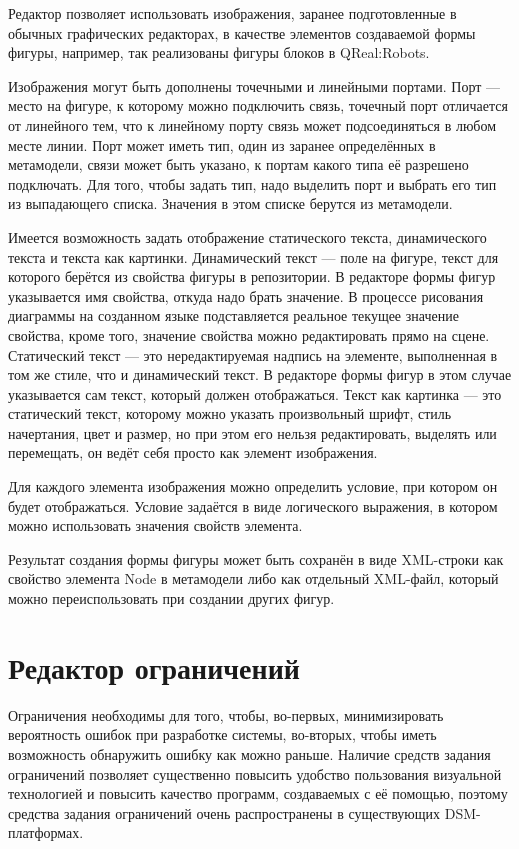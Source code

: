 Редактор позволяет использовать изображения, заранее подготовленные в обычных графических 
редакторах, в качестве элементов создаваемой формы фигуры, например, так реализованы 
фигуры блоков в QReal:Robots. 

Изображения могут быть дополнены точечными и линейными портами. Порт --- место на 
фигуре, к которому можно подключить связь, точечный порт отличается от линейного тем, 
что к линейному порту связь может подсоединяться в любом месте линии. Порт может иметь 
тип, один из заранее определённых в метамодели, связи может быть указано, к портам 
какого типа её разрешено подключать. Для того, чтобы задать тип, надо выделить порт 
и выбрать его тип из выпадающего списка. Значения в этом списке берутся из метамодели.

Имеется возможность задать отображение статического текста, динамического текста и 
текста как картинки. Динамический текст --- поле на фигуре, текст для которого берётся 
из свойства фигуры в репозитории. В редакторе формы фигур указывается имя свойства, 
откуда надо брать значение. В процессе рисования диаграммы на созданном языке подставляется 
реальное текущее значение свойства, кроме того, значение свойства можно редактировать 
прямо на сцене. Статический текст --- это нередактируемая надпись на элементе, выполненная 
в том же стиле, что и динамический текст. В редакторе формы фигур в этом случае указывается 
сам текст, который должен отображаться. Текст как картинка --- это статический текст, 
которому можно указать произвольный шрифт, стиль начертания, цвет и размер, но при 
этом его нельзя редактировать, выделять или перемещать, он ведёт себя просто как элемент 
изображения.

Для каждого элемента изображения можно определить условие, при котором он будет отображаться. 
Условие задаётся в виде логического выражения, в котором можно использовать значения 
свойств элемента. 

Результат создания формы фигуры может быть сохранён в виде XML-строки как свойство 
элемента Node в метамодели либо как отдельный XML-файл, который можно переиспользовать 
при создании других фигур.

\section{Редактор ограничений}
Ограничения необходимы для того, чтобы, во-первых, минимизировать вероятность ошибок 
при разработке системы, во-вторых, чтобы иметь возможность обнаружить ошибку как можно 
раньше. Наличие средств задания ограничений позволяет существенно повысить удобство 
пользования визуальной технологией и повысить качество программ, создаваемых с её помощью, 
поэтому средства задания ограничений очень распространены в существующих DSM-платформах. 

